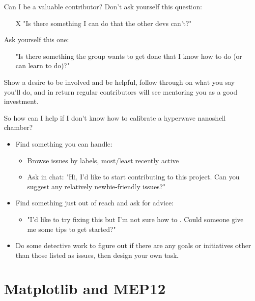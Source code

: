 \documentclass{beamer}
\begin{document}
\begin{frame}{Can I be a valuable contributor?}
	Don't ask yourself this question:
	\begin{itemize}
		\item[X] \alert{"Is there something I can do that the other devs can't?"}
	\end{itemize}
	\vskip20pt
	Ask yourself this one:
	\begin{itemize}
		\item[\checkmark] \alert{"Is there something the group wants to get done that I know how to do (or can learn to do)?"}
	\end{itemize}
	\vskip20pt
	Show a desire to be involved and be helpful, follow through on what you say you'll do, and in return regular contributors will see mentoring you as a good investment.
\end{frame}


\begin{frame}{So how can I help if I don't know how to calibrate a hyperwave nanoshell chamber?}
	\\[4pt]
	\begin{itemize}
		\item Find something you can handle:
		\begin{itemize}
			\item Browse issues by labels, most/least recently active
			\item Ask in chat: \alert{"Hi, I'd like to start contributing to this project.  Can you suggest any relatively newbie-friendly issues?"}
		\end{itemize}
		\vskip10pt
		\item Find something just out of reach and ask for advice:
		\begin{itemize}
			\item \alert{"I'd like to try fixing this but I'm not sure how to \underline{\qquad \qquad}.  Could someone give me some tips to get started?"}
		\end{itemize}
		\vskip10pt
		\item Do some detective work to figure out if there are any goals or initiatives other than those listed as issues, then design your own task.
	\end{itemize}
\end{frame}


\section{Matplotlib and MEP12}
\begin{frame}
	\centering
\end{frame}
\end{document}
